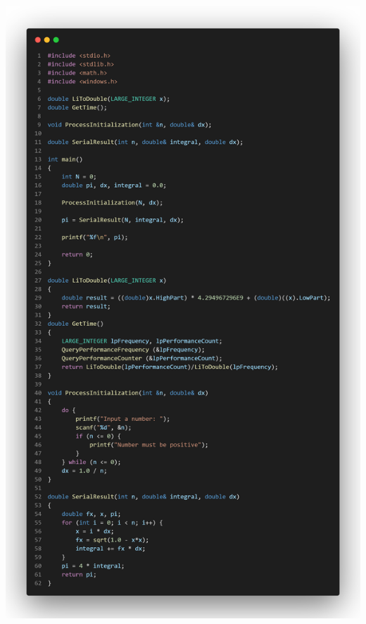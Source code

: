 \documentclass[12pt,a4paper]{report}
\begin{document}
\begin{center}
	\includegraphics[trim=0in 0in 0in 29in, clip, scale=0.2]{./Photos/PI/serial.PNG}
\end{center}
\end{document}
